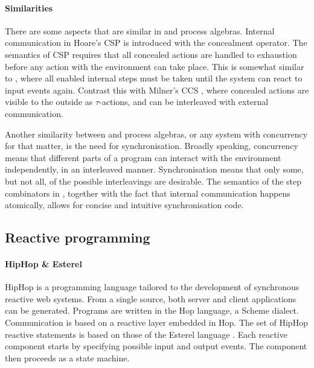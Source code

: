 \paragraph{Similarities}
There are some aspects that are similar in \TOPHAT and process algebras.
Internal communication in Hoare's CSP \cite{books/Hoare85CSP} is introduced with the concealment operator.
The semantics of CSP requires that all concealed actions are handled to exhaustion before any action with the environment can take place.
This is somewhat similar to \TOPHAT, where all enabled internal steps must be taken until the system can react to input events again.
Contrast this with Milner's CCS \cite{books/Milner89CAC}, where concealed actions are visible to the outside as $\tau$-actions, and can be interleaved with external communication.

Another similarity between \TOPHAT and process algebras, or any system with concurrency for that matter, is the need for synchronisation.
Broadly speaking, concurrency means that different parts of a program can interact with the environment independently, in an interleaved manner.
Synchronisation means that only some, but not all, of the possible interleavings are desirable.
The semantics of the step combinators in \TOPHAT, together with the fact that internal communication happens atomically, allows for concise and intuitive synchronisation code.



\subsection{Reactive programming}

\paragraph{HipHop \& Esterel}

HipHop \cite{berry2011hiphop,journals/corr/BerryS13} is a programming language tailored to the development of synchronous reactive web systems.
From a single source, both server and client applications can be generated.
Programs are written in the Hop language, a Scheme dialect.
Communication is based on a reactive layer embedded in Hop.
The set of HipHop reactive statements is based on those of the Esterel language \cite{boussinot1991esterel,journals/scp/BerryG92}.
Each reactive component starts by specifying possible input and output events.
The component then proceeds as a state machine.

